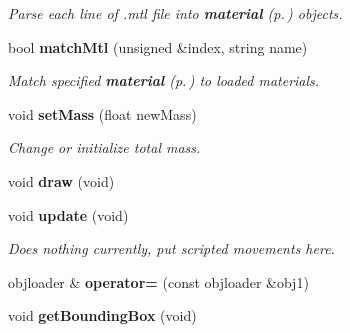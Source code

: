 \begin{CompactItemize}
\begin{CompactList}\small\item\em Parse each line of .mtl file into {\bf material} {\rm (p.\,\pageref{classmaterial})} objects.\item\end{CompactList}\item 
{}
bool {\bf match\-Mtl} (unsigned \&index, string name)\label{classobjloader_a7}

\begin{CompactList}\small\item\em Match specified {\bf material} {\rm (p.\,\pageref{classmaterial})} to loaded materials.\item\end{CompactList}\item 
{}
void {\bf set\-Mass} (float new\-Mass)\label{classobjloader_a8}

\begin{CompactList}\small\item\em Change or initialize total mass.\item\end{CompactList}\item 
{}
void {\bf draw} (void)\label{classobjloader_a9}

\item 
{}
void {\bf update} (void)\label{classobjloader_a10}

\begin{CompactList}\small\item\em Does nothing currently, put scripted movements here.\item\end{CompactList}\item 
{}
objloader \& {\bf operator=} (const objloader \&obj1)\label{classobjloader_a11}

\item 
{}
void {\bf get\-Bounding\-Box} (void)\label{classobjloader_a12}

\end{CompactItemize}
